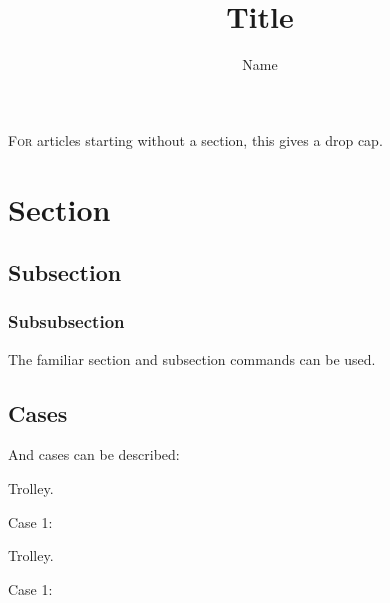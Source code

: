 \documentclass{ergoclass}
\title{Title}
\author{Name}
\affiliation{Affiliation}
\newcommand{\gripsum}[1]{\textcolor{mygrey}{\lipsum[#1]}}
\begin{document}
\maketitle

\lettrine{F}{or} articles starting without a section, this gives a drop cap. \gripsum{2}

\section{Section}
\subsection{Subsection}
\subsubsection{Subsubsection}
The familiar section and subsection commands can be used. \gripsum{3}
\subsection{Cases}
And cases can be described:
\begin{ergodescription}
\item[Trolley.] \gripsum{121}
\item[Case 1:] \gripsum{130}
\end{ergodescription}
\gripsum{4}
\begin{ergodescription}
\item[Trolley.] \gripsum{121}
\item[Case 1:] \gripsum{130}
\end{ergodescription}

\gripsum{5}
\end{document}
